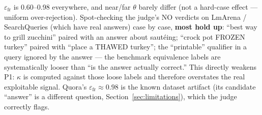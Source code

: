 \documentclass[11pt]{article}
\begin{document}
$\varepsilon_\text{fr}$ is 0.60--0.98 everywhere, and near/far $\theta$ barely differ (not a hard-case effect --- uniform over-rejection). Spot-checking the judge's NO verdicts on LmArena / SearchQueries (which have real answers) case by case, \textbf{most hold up}: ``best way to grill zucchini'' paired with an answer about saut\'eing; ``crock pot FROZEN turkey'' paired with ``place a THAWED turkey''; the ``printable'' qualifier in a query ignored by the answer --- the benchmark equivalence labels are systematically looser than ``is the answer actually correct.'' This directly weakens P1: $\kappa$ is computed against those loose labels and therefore overstates the real exploitable signal. Quora's $\varepsilon_\text{fr} \approx 0.98$ is the known dataset artifact (its candidate ``answer'' is a different question, Section~\ref{sec:limitations}), which the judge correctly flags.
\end{document}
